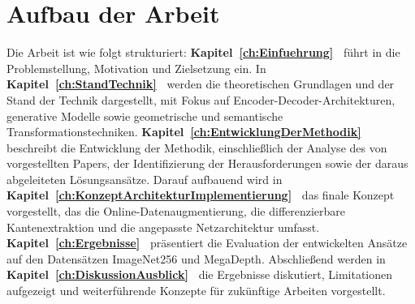 


\newpage

\section{Aufbau der Arbeit}
\label{sec:Aufbau der Arbeit}
Die Arbeit ist wie folgt strukturiert: \textbf{Kapitel~\ref{ch:Einfuehrung}~} führt in die Problemstellung, Motivation und Zielsetzung ein.
In \textbf{Kapitel~\ref{ch:StandTechnik}~} werden die theoretischen Grundlagen und der Stand der Technik dargestellt, mit Fokus auf Encoder-Decoder-Architekturen, generative Modelle sowie geometrische und semantische Transformationstechniken.
\textbf{Kapitel~\ref{ch:EntwicklungDerMethodik}~} beschreibt die Entwicklung der Methodik, einschließlich der Analyse des von \textcite{He_2023_ICCV} vorgestellten Papers, der Identifizierung der Herausforderungen sowie der daraus abgeleiteten Lösungsansätze.
Darauf aufbauend wird in \textbf{Kapitel~\ref{ch:KonzeptArchitekturImplementierung}~} das finale Konzept vorgestellt, das die Online-Datenaugmentierung, die differenzierbare Kantenextraktion und die angepasste Netzarchitektur umfasst. 
\textbf{Kapitel~\ref{ch:Ergebnisse}~} präsentiert die Evaluation der entwickelten Ansätze auf den Datensätzen ImageNet256 und MegaDepth.
Abschließend werden in \textbf{Kapitel~\ref{ch:DiskussionAusblick}~} die Ergebnisse diskutiert, Limitationen aufgezeigt und weiterführende Konzepte für zukünftige Arbeiten vorgestellt.




